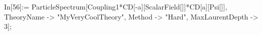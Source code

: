 In[56]:= ParticleSpectrum[Coupling1*CD[-a][ScalarField[]]*CD[a][Psi[]], TheoryName -> "MyVeryCoolTheory", Method -> "Hard", MaxLaurentDepth -> 3]; 